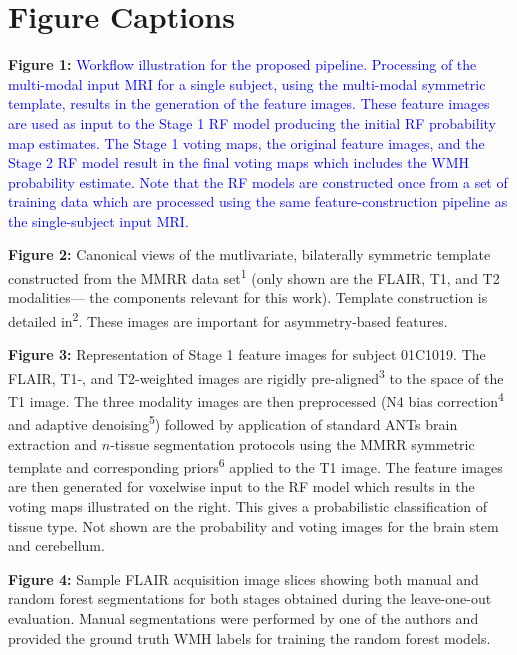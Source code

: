 \documentclass[12pt,]{article}
\title{}
\author{}
\date{}
\begin{document}
\maketitle

\section{Figure Captions}\label{figure-captions}

\textbf{Figure 1:}
\textcolor{blue}{Workflow illustration for the proposed pipeline.  Processing of the multi-modal
input MRI for a single subject, using the multi-modal symmetric template, results in
the generation of the feature images.  These feature images are used as input to the
Stage 1 RF model producing the initial RF probability map estimates.  The Stage 1
voting maps, the original feature images, and the Stage 2 RF model result in the
final voting maps which includes the WMH probability estimate.  Note that the RF models
are constructed once from a set of training data which are processed using the
same feature-construction pipeline as the single-subject input MRI.}

\textbf{Figure 2:} Canonical views of the mutlivariate, bilaterally
symmetric template constructed from the MMRR data set\textsuperscript{1}
(only shown are the FLAIR, T1, and T2 modalities--- the components
relevant for this work). Template construction is detailed
in\textsuperscript{2}. These images are important for asymmetry-based
features.

\textbf{Figure 3:} Representation of Stage 1 feature images for subject
01C1019. The FLAIR, T1-, and T2-weighted images are rigidly
pre-aligned\textsuperscript{3} to the space of the T1 image. The three
modality images are then preprocessed (N4 bias
correction\textsuperscript{4} and adaptive denoising\textsuperscript{5})
followed by application of standard ANTs brain extraction and
\(n\)-tissue segmentation protocols using the MMRR symmetric template
and corresponding priors\textsuperscript{6} applied to the T1 image. The
feature images are then generated for voxelwise input to the RF model
which results in the voting maps illustrated on the right. This gives a
probabilistic classification of tissue type. Not shown are the
probability and voting images for the brain stem and cerebellum.

\textbf{Figure 4:} Sample FLAIR acquisition image slices showing both
manual and random forest segmentations for both stages obtained during
the leave-one-out evaluation. Manual segmentations were performed by one
of the authors and provided the ground truth WMH labels for training the
random forest models.
\end{document}
